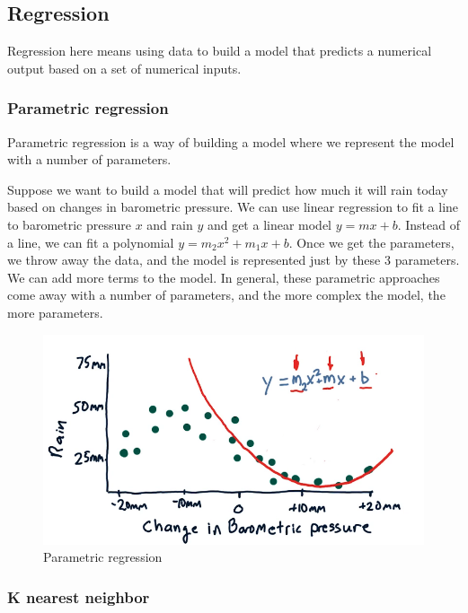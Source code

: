 \documentclass[12pt]{article}
\begin{document}
\subsection{Regression}

Regression here means using data to build a model that predicts a numerical output based on a set of numerical inputs. 

\subsubsection{Parametric regression}

Parametric regression is a way of building a model where we represent the model with a number of parameters.

Suppose we want to build a model that will predict how much it will rain today based on changes in barometric pressure. We can use linear regression to fit a line to barometric pressure $x$ and rain $y$ and get a linear model $y = mx+b$. Instead of a line, we can fit a polynomial $y=m_2x^2 + m_1x + b$. Once we get the parameters, we throw away the data, and the model is represented just by these 3 parameters. We can add more terms to the model. In general, these parametric approaches come away with a number of parameters, and the more complex the model, the more parameters. 

\begin{figure}[!ht]
\centering
\includegraphics[scale=0.45]{fig/fig82}
\caption{Parametric regression}
\end{figure}

\subsubsection{K nearest neighbor}
\end{document}
